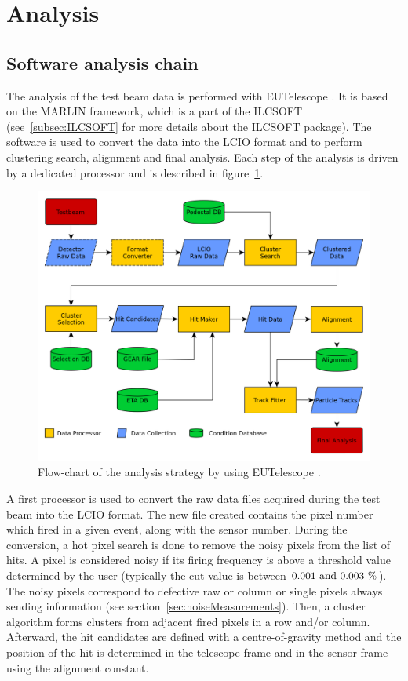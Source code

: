   \section{Analysis}
  \label{sec:X0}

   \subsection{Software analysis chain}

    The analysis of the test beam data is performed with EUTelescope \cite{Eutel}\cite{Jansen}.
    It is based on the MARLIN framework, which is a part of the ILCSOFT (see~\ref{subsec:ILCSOFT} for more details about the ILCSOFT package).
    The software is used to convert the data into the LCIO format and to perform clustering search, alignment and final analysis.
    Each step of the analysis is driven by a dedicated processor and is described in figure~\ref{fig:eutel-strategy}.
    
    \begin{figure}[!h]
      \centering
      \includegraphics[width = \textwidth]{Pictures/X0/eutel-strategy.png}
      \caption{Flow-chart of the analysis strategy by using EUTelescope \cite{EUTelFlowChart}.}
      \label{fig:eutel-strategy}
    \end{figure}

    A first processor is used to convert the raw data files acquired during the test beam into the LCIO format.
    The new file created contains the pixel number which fired in a given event, along with the sensor number.
    During the conversion, a hot pixel search is done to remove the noisy pixels from the list of hits.
    A pixel is considered noisy if its firing frequency is above a threshold value determined by the user (typically the cut value is between $0.001~\rm{and}~0.003~\%$).
    The noisy pixels correspond to defective raw or column or single pixels always sending information (see section~\ref{sec:noiseMeasurements}).
    Then, a cluster algorithm forms clusters from adjacent fired pixels in a row and/or column.
    Afterward, the hit candidates are defined with a centre-of-gravity method and the position of the hit is determined in the telescope frame and in the sensor frame using the alignment constant.

